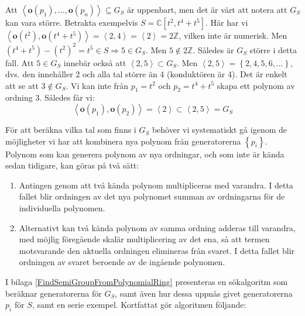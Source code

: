 Att $\left<\mathbf{o}(p_1),\ldots,\mathbf{o}(p_n)\right> \subseteq G_S$ är uppenbart, men det är värt att notera att $G_S$ kan vara större. Betrakta exempelvis $S=\mathbb{C}[t^2,t^4+t^5]$. Här har vi $\left<\mathbf{o}(t^2),\mathbf{o}(t^4+t^5)\right> = \left<2,4\right>=\left<2\right> = 2\mathbb{Z}$, vilken inte är numerisk. Men $\left(t^4+t^5\right)-\left(t^2\right)^2 = t^5 \in S \Longrightarrow 5 \in G_S$. Men $5 \notin 2\mathbb{Z}$. Således är $G_S$ större i detta fall. Att $5 \in G_S$ innebär också att $\left<2,5\right> \subset G_S$. Men $\left<2,5\right> = \left\{2, 4, 5, 6, \ldots\right\}$, dvs. den innehåller 2 och alla tal större än 4 (konduktören är 4). Det är enkelt att se att $3 \notin G_S$. Vi kan inte från $p_1=t^2$ och $p_2=t^4+t^5$ skapa ett polynom av ordning 3. Således får vi:
\[\left<\mathbf{o}(p_1),\mathbf{o}(p_2)\right> = \left<2\right> \subset \left<2,5\right> = G_S \]

\label{SearchPolynomials}
För att beräkna vilka tal som finns i $G_S$ behöver vi systematiskt gå igenom de möjligheter vi har att kombinera nya polynom från generatorerna $\left\{p_i\right\}$. Polynom som kan generera polynom av nya ordningar, och som inte är kända sedan tidigare, kan göras på två sätt:

\begin{enumerate}
\item Antingen genom att två kända polynom multipliceras med varandra. I detta fallet blir ordningen av det nya polynomet summan av ordningarna för de individuella polynomen.

\item Alternativt kan två kända polynom av samma ordning adderas till varandra, med möjlig föregående skalär multiplicering av det ena, så att termen motsvarande den aktuella ordningen elimineras från svaret. I detta fallet blir ordningen av svaret beroende av de ingående polynomen.
\end{enumerate}

I bilaga \ref{FindSemiGroupFromPolynomialRing} presenteras en sökalgoritm som beräknar generatorerna för $G_S$, samt även hur dessa uppnås givet generatorerna $p_i$ för $S$, samt en serie exempel. Kortfattat gör algoritmen följande:

